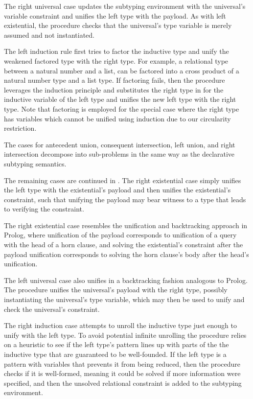 \documentclass[acmsmall]{acmart}
\theoremstyle{definition}
\begin{document}
The right universal case updates the subtyping environment with the universal's variable constraint
and unifies the left type with the payload. As with left existential, the procedure checks that
the universal's type variable is merely assumed and not instantiated.

The left induction rule first tries to factor the inductive type and unify the weakened factored type
with the right type. For example, a relational type between a natural number and a list, can be factored into
a cross product of a natural number type and a list type. 
If factoring fails, then the procedure leverages the induction principle and substitutes the right type 
in for the inductive variable of the left type and unifies the new left type with the right type.    
Note that factoring is employed for the special
case where the right type has variables which cannot be unified 
using induction due to our circularity restriction.  

The cases for antecedent union, consequent intersection, left union, and right intersection
decompose into sub-problems in the same way as the declarative subtyping semantics.

The remaining cases are continued in .
The right existential case simply unifies the left type with the existential's payload
and then unifies the existential's constraint, such that unifying the payload
may bear witness to a type that leads to verifying the constraint. 


The right existential case resembles the unification and backtracking approach in Prolog, 
where unification of the payload corresponds to unification of a query with the head of a horn clause,
and solving the existential's constraint after the payload unification corresponds to
solving the horn clause's body after the head's unification.  

The left universal case also unifies in a backtracking fashion analogous to Prolog.
The procedure unifies the universal's payload with the right type,
possibly instantiating the universal's type variable,
which may then be used to unify and check the universal's constraint.

The right induction case attempts to unroll the inductive type just enough
to unify with the left type. To avoid potential infinite unrolling
the procedure relies on a heuristic to see if the left type's pattern
lines up with parts of the the inductive type that are guaranteed to be well-founded. 
If the left type is a pattern with variables that prevents it from being reduced,
then the procedure checks if it is well-formed, meaning it could be solved 
if more information were specified, and then the unsolved relational constraint
is added to the subtyping environment. 
\end{document}
